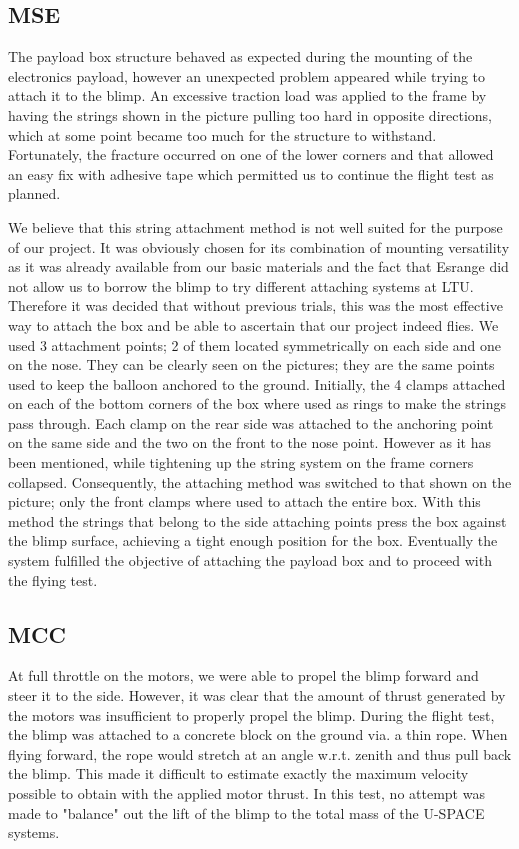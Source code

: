 \subsection{MSE}
The payload box structure behaved as expected during the mounting of the electronics payload, however an unexpected problem appeared while trying to attach it to the blimp.  An excessive traction load was applied to the frame by having the strings shown in the picture pulling too hard in opposite directions, which at some point became too much for the structure to withstand. Fortunately, the fracture occurred on one of the lower corners and that allowed an easy fix with adhesive tape which permitted us to continue the flight test as planned. 

We believe that this string attachment method is not well suited for the purpose of our project. It was obviously chosen for its combination of mounting versatility as it was already available from our basic materials and the fact that Esrange did not allow us to borrow the blimp to try different attaching systems at LTU. Therefore it was decided that without previous trials, this was the most effective way to attach the box and be able to ascertain that our project indeed flies. 
We used 3 attachment points; 2 of them located symmetrically on each side and one on the nose. They can be clearly seen on the pictures; they are the same points used to keep the balloon anchored to the ground.
Initially, the 4 clamps attached on each of the bottom corners of the box where used as rings to make the strings pass through. Each clamp on the rear side was attached to the anchoring point on the same side and the two on the front to the nose point. However as it has been mentioned, while tightening up the string system on the frame corners collapsed. Consequently, the attaching method was switched to that shown on the picture; only the front clamps where used to attach the entire box. With this method the strings that belong to the side attaching points press the box against the blimp surface, achieving a tight enough position for the box. 
Eventually the system fulfilled the objective of attaching the payload box and to proceed with the flying test. 


\subsection{MCC}
At full throttle on the motors, we were able to propel the blimp forward and steer it to the side. However, it was clear that the amount of thrust generated by the motors was insufficient to properly propel the blimp. During the flight test, the blimp was attached to a concrete block on the ground via. a thin rope. When flying forward, the rope would stretch at an angle w.r.t. zenith and thus pull back the blimp. This made it difficult to estimate exactly the maximum velocity possible to obtain with the applied motor thrust. In this test, no attempt was made to "balance" out the lift of the blimp to the total mass of the U-SPACE systems. 

